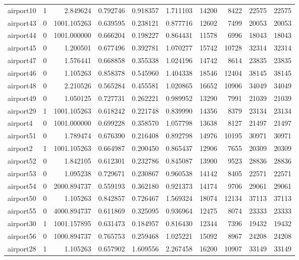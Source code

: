 \begin{longtable}{|l|r|r|r|r|r|r|r|r|r|}
airport10 & 1 & 2.849624 & 0.792746 & 0.918357 & 1.711103 & 14200 & 8422 & 22575 & 22575 \\
airport43 & 0 & 1001.105263 & 0.639595 & 0.238121 & 0.877716 & 12602 & 7499 & 20053 & 20053 \\
airport44 & 0 & 1001.000000 & 0.666204 & 0.198227 & 0.864431 & 11578 & 6996 & 18043 & 18043 \\
airport45 & 0 & 1.200501 & 0.677496 & 0.392781 & 1.070277 & 15742 & 10728 & 32314 & 32314 \\
airport47 & 0 & 1.576441 & 0.668858 & 0.355338 & 1.024196 & 14742 & 8614 & 23835 & 23835 \\
airport46 & 0 & 1.105263 & 0.858378 & 0.545960 & 1.404338 & 18546 & 12404 & 38145 & 38145 \\
airport48 & 0 & 2.210526 & 0.565284 & 0.455581 & 1.020865 & 16652 & 10906 & 34049 & 34049 \\
airport49 & 0 & 1.050125 & 0.727731 & 0.262221 & 0.989952 & 13290 & 7991 & 21039 & 21039 \\
airport29 & 1 & 1001.105263 & 0.618242 & 0.221748 & 0.839990 & 14356 & 8379 & 23134 & 23134 \\
airport4 & 0 & 1001.000000 & 0.699228 & 0.358570 & 1.057798 & 13638 & 8127 & 21497 & 21497 \\
airport51 & 0 & 1.789474 & 0.676390 & 0.216408 & 0.892798 & 14976 & 10195 & 30971 & 30971 \\
airport2 & 1 & 1001.105263 & 0.664987 & 0.200450 & 0.865437 & 12906 & 7655 & 20309 & 20309 \\
airport52 & 0 & 1.842105 & 0.612301 & 0.232786 & 0.845087 & 13900 & 9523 & 28836 & 28836 \\
airport53 & 0 & 1.095238 & 0.729671 & 0.230867 & 0.960538 & 14142 & 8405 & 22571 & 22571 \\
airport54 & 0 & 2000.894737 & 0.559193 & 0.362180 & 0.921373 & 14174 & 9706 & 29061 & 29061 \\
airport50 & 0 & 1.105263 & 0.842857 & 0.726467 & 1.569324 & 18074 & 12134 & 37113 & 37113 \\
airport55 & 0 & 4000.894737 & 0.611869 & 0.325095 & 0.936964 & 12475 & 8074 & 23333 & 23333 \\
airport30 & 1 & 1001.157895 & 0.631473 & 0.184957 & 0.816430 & 12344 & 7396 & 19432 & 19432 \\
airport56 & 0 & 1000.894737 & 0.765753 & 0.259468 & 1.025221 & 15092 & 8967 & 24208 & 24208 \\
airport28 & 1 & 1.105263 & 0.657902 & 1.609556 & 2.267458 & 16200 & 10907 & 33149 & 33149 \\

\end{longtable}
